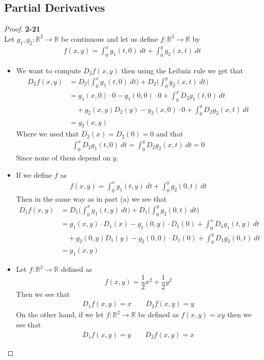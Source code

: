 \documentclass[11pt]{article}
\newcommand{\R}{\mathbb{R}}
\theoremstyle{definition}
\begin{document}
\subsection*{Partial Derivatives}
\begin{proof}{\textbf{2-21}}\\
Let $g_1,g_2: \R^2 \to \R$ be continuous and let us define $f:\R^2 \to\R$ by
\begin{align*}
    f(x,y) = \int_{0}^x g_1(t,0)~dt + \int_{0}^y g_2(x,t)~dt
\end{align*}
\begin{itemize}
\item [(a)] We want to compute $D_2f(x,y)$ then using the Leibniz rule we get
that
\begin{align*}
    D_2f(x,y) &= D_2\bigg(\int_{0}^x g_1(t,0)~dt\bigg)
    + D_2\bigg(\int_{0}^y g_2(x,t)~dt\bigg)\\
    &= g_1(x,0)\cdot 0 - g_1(0,0)\cdot 0 + \int_{0}^x D_2g_1(t,0)~dt\\
    &\quad+ g_2(x,y) D_2(y) - g_2(x,0)\cdot 0 + \int_{0}^y D_2g_2(x,t)~dt\\
    &= g_2(x,y)
\end{align*}
Where we used that $D_2(x) = D_2(0) = 0$ and that
\begin{align*}
    \int_{0}^x D_2g_1(t,0)~dt = \int_{0}^y D_2g_2(x,t)~dt = 0
\end{align*}
Since none of them depend on $y$.
\item [(b)] If we define $f$ as
\begin{align*}
    f(x,y) = \int_{0}^x g_1(t,y)~dt + \int_{0}^y g_2(0,t)~dt
\end{align*}
Then in the same way as in part (a) we see that
\begin{align*}
    D_1f(x,y) &= D_1\bigg(\int_{0}^x g_1(t,y)~dt\bigg)
    + D_1\bigg(\int_{0}^y g_2(0,t)~dt\bigg)\\
    &= g_1(x,y)\cdot D_1(x) - g_1(0,y)\cdot D_1(0) + \int_{0}^x D_1g_1(t,y)~dt\\
    &\quad+ g_2(0,y) D_1(y) - g_2(0,0)\cdot D_1(0) + \int_{0}^y D_1g_2(0,t)~dt\\
    &= g_1(x,y)
\end{align*}
\item [(c)] Let $f:\R^2 \to \R$ defined as
$$f(x,y) = \frac{1}{2}x^2 + \frac{1}{2}y^2$$
Then we see that
\begin{align*}
    D_1f(x,y) = x \qquad D_2f(x,y) = y
\end{align*}
On the other hand, if we let $f:\R^2 \to \R$ be defined as $f(x,y) = xy$ then
we see that
\begin{align*}
    D_1f(x,y) = y \qquad D_2f(x,y) = x
\end{align*}
\end{itemize}
\end{proof}
\end{document}
